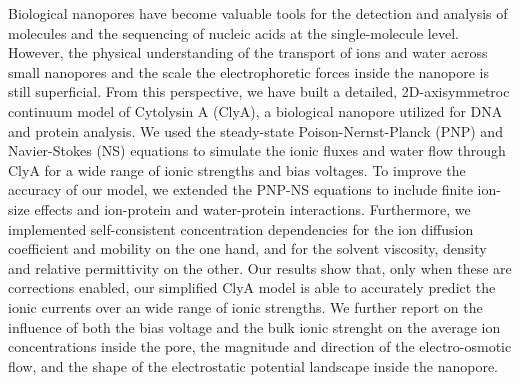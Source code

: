 Biological nanopores have become valuable tools for the detection and analysis of molecules and the sequencing of nucleic acids at the single-molecule level. However, the physical understanding of the transport of ions and water across small nanopores and the scale the electrophoretic forces inside the nanopore is still superficial. From this perspective, we have built a detailed, 2D-axisymmetroc continuum model of Cytolysin A (ClyA), a biological nanopore utilized for DNA and protein analysis. We used the steady-state Poison-Nernst-Planck (PNP) and Navier-Stokes (NS) equations to simulate the ionic fluxes and water flow through ClyA for a wide range of ionic strengths and bias voltages. To improve the accuracy of our model, we extended the PNP-NS equations to include finite ion-size effects and ion-protein and water-protein interactions. Furthermore, we implemented self-consistent concentration dependencies for the ion diffusion coefficient and mobility on the one hand, and for the solvent viscosity, density and relative permittivity on the other. Our results show that, only when these are corrections enabled, our simplified ClyA model is able to accurately predict the ionic currents over an wide range of ionic strengths. We further report on the influence of both the bias voltage and the bulk ionic strenght on the average ion concentrations inside the pore, the magnitude and direction of the electro-osmotic flow, and the shape of the electrostatic potential landscape inside the nanopore.